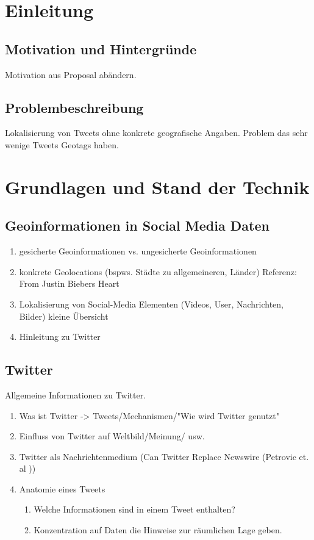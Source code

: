 \chapter{Einleitung}

\section{Motivation und Hintergründe}
Motivation aus Proposal abändern.

\section{Problembeschreibung}
Lokalisierung von Tweets ohne konkrete geografische Angaben. Problem das sehr wenige Tweets Geotags haben.

\chapter{Grundlagen und Stand der Technik}
	\section{Geoinformationen in Social Media Daten}
 		\begin{enumerate}
 			\item {} gesicherte Geoinformationen vs. ungesicherte Geoinformationen
 			\item konkrete Geolocations (bspws. Städte zu allgemeineren, Länder) Referenz: From Justin Biebers Heart 
 			\item Lokalisierung von Social-Media Elementen (Videos, User, Nachrichten, Bilder) kleine Übersicht
 			\item Hinleitung zu Twitter  
 		\end{enumerate}

	\section{Twitter}
		Allgemeine Informationen zu Twitter. 
		\begin{enumerate}
			\item Was ist Twitter -> Tweets/Mechanismen/"Wie wird Twitter genutzt"
			\item {} Einfluss von Twitter auf Weltbild/Meinung/ usw.
			\item Twitter als Nachrichtenmedium (Can Twitter Replace Newswire (Petrovic et. al ))
			\item Anatomie eines Tweets 
				\begin{enumerate}
					\item Welche Informationen sind in einem Tweet enthalten? 
					\item Konzentration auf Daten die Hinweise zur räumlichen Lage geben.
				\end{enumerate}
		\end{enumerate}
		
